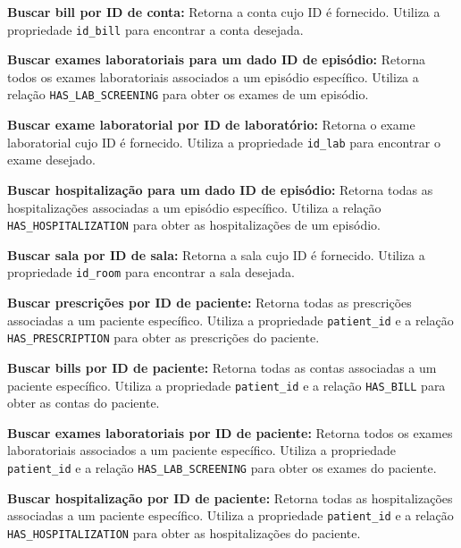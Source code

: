 \vspace{0.15cm}
\textbf{Buscar bill por ID de conta:} Retorna a conta cujo ID é fornecido. Utiliza a propriedade \texttt{id\_bill} para encontrar a conta desejada.

\vspace{0.15cm}
\textbf{Buscar exames laboratoriais para um dado ID de episódio:} Retorna todos os exames laboratoriais associados a um episódio específico. Utiliza a relação \texttt{HAS\_LAB\_SCREENING} para obter os exames de um episódio.

\vspace{0.15cm}
\textbf{Buscar exame laboratorial por ID de laboratório:} Retorna o exame laboratorial cujo ID é fornecido. Utiliza a propriedade \texttt{id\_lab} para encontrar o exame desejado.

\vspace{0.15cm}
\textbf{Buscar hospitalização para um dado ID de episódio:} Retorna todas as hospitalizações associadas a um episódio específico. Utiliza a relação \texttt{HAS\_HOSPITALIZATION} para obter as hospitalizações de um episódio.

\vspace{0.15cm}
\textbf{Buscar sala por ID de sala:} Retorna a sala cujo ID é fornecido. Utiliza a propriedade \texttt{id\_room} para encontrar a sala desejada.

\vspace{0.15cm}
\textbf{Buscar prescrições por ID de paciente:} Retorna todas as prescrições associadas a um paciente específico. Utiliza a propriedade \texttt{patient\_id} e a relação \texttt{HAS\_PRESCRIPTION} para obter as prescrições do paciente.

\vspace{0.15cm}
\textbf{Buscar bills por ID de paciente:} Retorna todas as contas associadas a um paciente específico. Utiliza a propriedade \texttt{patient\_id} e a relação \texttt{HAS\_BILL} para obter as contas do paciente.

\vspace{0.15cm}
\textbf{Buscar exames laboratoriais por ID de paciente:} Retorna todos os exames laboratoriais associados a um paciente específico. Utiliza a propriedade \texttt{patient\_id} e a relação \texttt{HAS\_LAB\_SCREENING} para obter os exames do paciente.

\vspace{0.15cm}
\textbf{Buscar hospitalização por ID de paciente:} Retorna todas as hospitalizações associadas a um paciente específico. Utiliza a propriedade \texttt{patient\_id} e a relação \texttt{HAS\_HOSPITALIZATION} para obter as hospitalizações do paciente.

